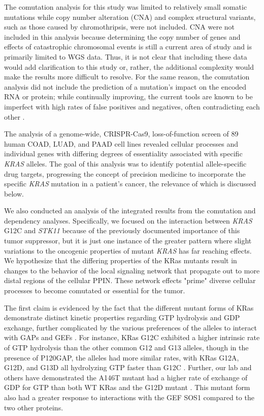\documentclass[english, 10pt, letterpaper]{article}
\newcommand{\KRAS}{\emph{KRAS}}
\newcommand{\kras}{KRas}
\begin{document}
The comutation analysis for this study was limited to relatively small somatic mutations while copy number alteration (CNA) and complex structural variants, such as those caused by chromothripsis, were not included.
CNA were not included in this analysis because determining the copy number of genes and effects of catastrophic chromosomal events is still a current area of study and is primarily limited to WGS data.
Thus, it is not clear that including these data would add clarification to this study or, rather, the additional complexity would make the results more difficult to resolve.
For the same reason, the comutation analysis did not include the prediction of a mutation's impact on the encoded RNA or protein; while continually improving, the current tools are known to be imperfect with high rates of false positives and negatives, often contradicting each other \cite{Dong2015ComparisonStudies., Chun2009IdentificationGenomes., Schwarz2010MutationTasterAlterations., Thusberg2011PerformanceVariants., Wei2011IncorporatingStudy., Flanagan2010UsingMutations.}.

The analysis of a genome-wide, CRISPR-Cas9, loss-of-function screen of 89 human COAD, LUAD, and PAAD cell lines revealed cellular processes and individual genes with differing degrees of essentiality associated with specific \KRAS{} alleles.
The goal of this analysis was to identify potential allele-specific drug targets, progressing the concept of precision medicine to incorporate the specific \KRAS{} mutation in a patient's cancer, the relevance of which is discussed below.

We also conducted an analysis of the integrated results from the comutation and dependency analyses.
Specifically, we focused on the interaction between \KRAS{} G12C and \emph{STK11} because of the previously documented importance of this tumor suppressor, but it is just one instance of the greater pattern where slight variations to the oncogenic properties of mutant \KRAS{} has far reaching effects.
We hypothesize that the differing properties of the \kras{} mutants result in changes to the behavior of the local signaling network that propagate out to more distal regions of the cellular PPIN.
These network effects "prime" diverse cellular processes to become comutated or essential for the tumor.

The first claim is evidenced by the fact that the different mutant forms of \kras{} demonstrate distinct kinetic properties regarding GTP hydrolysis and GDP exchange, further complicated by the various preferences of the alleles to interact with GAPs and GEFs \cite{Smith2013, Hunter2015a}.
For instance, \kras{} G12C exhibited a higher intrinsic rate of GTP hydrolysis than the other common G12 and G13 alleles, though in the presence of P120GAP, the alleles had more similar rates, with \kras{} G12A, G12D, and G13D all hydrolyzing GTP faster than G12C \cite{Hunter2015a}.
Further, our lab and others have demonstrated the A146T mutant had a higher rate of exchange of GDP for GTP than both WT \kras{} and the G12D mutant \cite{Feig1988RelationshipProteins., Edkins2006, Janakiraman2010, Poulin2019}.
This mutant form also had a greater response to interactions with the GEF SOS1 compared to the two other proteins.
\end{document}
